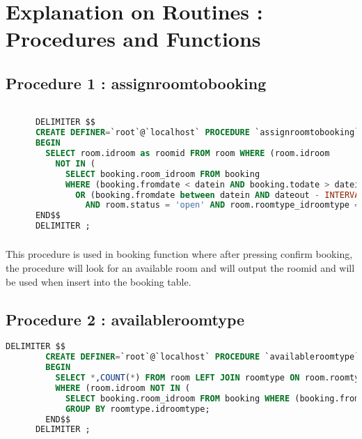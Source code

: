 
  \chapter{Explanation on Routines : Procedures and Functions}
    \section{Procedure 1 : assignroomtobooking}
    \ttfamily
      \begin{lstlisting}[language=SQL]

      DELIMITER $$
      CREATE DEFINER=`root`@`localhost` PROCEDURE `assignroomtobooking`(IN `datein` DATE, IN `dateout` DATE, IN `type` INT, OUT `roomid` INT)
      BEGIN
        SELECT room.idroom as roomid FROM room WHERE (room.idroom
          NOT IN (
            SELECT booking.room_idroom FROM booking
            WHERE (booking.fromdate < datein AND booking.todate > datein)
              OR (booking.fromdate between datein AND dateout - INTERVAL 1 DAY))
                AND room.status = 'open' AND room.roomtype_idroomtype = type) LIMIT 1;
      END$$
      DELIMITER ;
      \end{lstlisting}
      \rmfamily
      \paragraph{}
        This procedure is used in booking function where after pressing confirm booking, the procedure will look for an available room and will output the roomid and will
         be used when insert into the booking table.

    \section{Procedure 2 : availableroomtype}
      \ttfamily
      \begin{lstlisting}[language=SQL]
      DELIMITER $$
        CREATE DEFINER=`root`@`localhost` PROCEDURE `availableroomtype`(IN `infromdate` DATE, IN `intodate` DATE)
        BEGIN
          SELECT *,COUNT(*) FROM room LEFT JOIN roomtype ON room.roomtype_idroomtype = roomtype.idroomtype
          WHERE (room.idroom NOT IN (
            SELECT booking.room_idroom FROM booking WHERE (booking.fromdate < infromdate AND booking.todate > infromdate) OR (booking.fromdate between infromdate AND intodate - INTERVAL 1 DAY)) AND room.status = 'open')
            GROUP BY roomtype.idroomtype;
        END$$
      DELIMITER ;

      \end{lstlisting}
      \rmfamily
